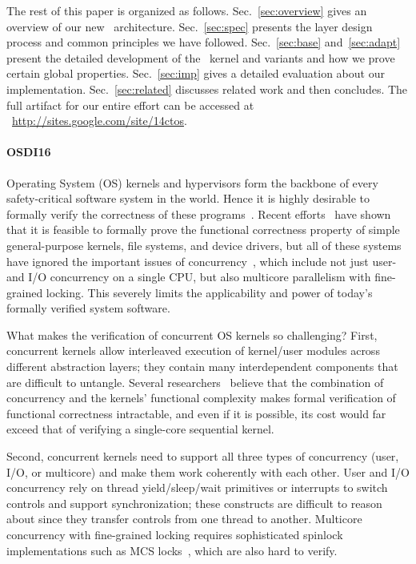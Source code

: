 {The rest of this paper is organized as follows.
Sec.~\ref{sec:overview} gives an overview of our new
\CTOS\ architecture. Sec.~\ref{sec:spec} presents the layer design
process and common principles we have followed. Sec.~\ref{sec:base}
and~\ref{sec:adapt} present the detailed development of the
\mCTOS\ kernel and variants and how we prove certain global properties.
Sec.~\ref{sec:imp} gives a detailed evaluation about our
implementation. Sec.~\ref{sec:related} %
discusses
related work and then concludes.  The full artifact for our entire
effort can be accessed at
{~\small\url{http://sites.google.com/site/14ctos}}.


\paragraph{OSDI16}
Operating System (OS) kernels and hypervisors form the backbone of
every safety-critical software system in the world.  Hence it is
highly desirable to formally verify the correctness of these
programs~\cite{shao10}. 
Recent efforts~\cite{klein2009sel4,hawblitzel10,klein14,ironclad14,dscal15,fscq15,cogent16,chen16}
have shown that it is feasible to formally prove the functional
correctness property of simple general-purpose kernels, file systems,
and device drivers, but all of these systems have ignored the
important issues of concurrency~\cite{kaashoek15,ospp11}, which
include not just user- and I/O concurrency on a single CPU, but also
multicore parallelism with fine-grained locking. This severely limits
the applicability and power of today's formally verified system
software.

What makes the verification of concurrent OS kernels so challenging?
First, concurrent kernels allow interleaved execution of kernel/user
modules across different abstraction layers; they contain many
interdependent components that are difficult to untangle.  Several
researchers~\cite{vontessin13,peters15} believe that the combination
of concurrency and the kernels' functional complexity makes formal
verification of functional correctness intractable, and even if it is
possible, its cost would far exceed that of verifying a single-core
sequential kernel.

Second, concurrent kernels need to support all three types of
concurrency (user, I/O, or multicore) and make them work coherently
with each other. User and I/O concurrency rely on thread
yield/sleep/wait primitives or interrupts to switch controls and
support synchronization; these constructs are difficult to reason
about since they transfer controls from one thread to another.
Multicore concurrency with fine-grained locking requires sophisticated
spinlock implementations such as MCS locks~\cite{mcs91}, which are also
hard to verify.

}
